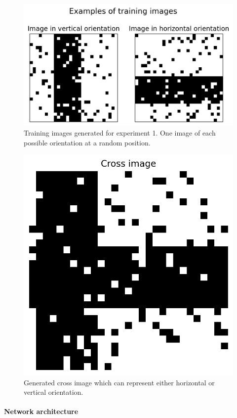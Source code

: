 \begin{figure}
  \includegraphics[width=\linewidth]{figures/horvert/horvertTrainingImages.png}
  \caption{Training images generated for experiment 1. One image of each possible orientation at a random position.}
  \label{fig:horvertImages}
\end{figure}

\begin{figure}
\centering
  \includegraphics[width=0.6\linewidth]{figures/horvert/horvertTrainingCrossImage.png}
  \caption{Generated cross image which can represent either horizontal or vertical orientation.}
  \label{fig:horvertTrainingCrossImage}
\end{figure}

\paragraph{Network architecture}

